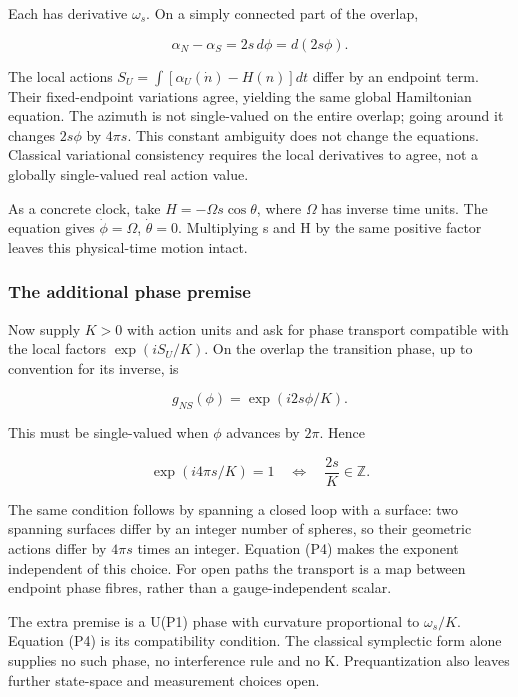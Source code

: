 \documentclass[11pt,a4paper]{article}
\begin{document}
Each has derivative \(\omega_s\). On a simply connected part of the
overlap,

\[\alpha_N-\alpha_S=2s\,d\phi=d(2s\phi). \tag{P3}\]

The local actions \(S_U=\int[\alpha_U(\dot n)-H(n)]dt\) differ by an
endpoint term. Their fixed-endpoint variations agree, yielding the same
global Hamiltonian equation. The azimuth is not single-valued on the
entire overlap; going around it changes \(2s\phi\) by \(4\pi s\). This
constant ambiguity does not change the equations. Classical variational
consistency requires the local derivatives to agree, not a globally
single-valued real action value.

As a concrete clock, take \(H=-\Omega s\cos\theta\), where \(\Omega\)
has inverse time units. The equation gives \(\dot\phi=\Omega\),
\(\dot\theta=0\). Multiplying s and H by the same positive factor leaves
this physical-time motion intact.

\hypertarget{the-additional-phase-premise}{%
\subsubsection{The additional phase
premise}\label{the-additional-phase-premise}}

Now supply \(K>0\) with action units and ask for phase transport
compatible with the local factors \(\exp(iS_U/K)\). On the overlap the
transition phase, up to convention for its inverse, is

\[g_{NS}(\phi)=\exp(i2s\phi/K).\]

This must be single-valued when \(\phi\) advances by \(2\pi\). Hence

\[\exp(i4\pi s/K)=1
\quad\Longleftrightarrow\quad \frac{2s}{K}\in\mathbb Z. \tag{P4}\]

The same condition follows by spanning a closed loop with a surface: two
spanning surfaces differ by an integer number of spheres, so their
geometric actions differ by \(4\pi s\) times an integer. Equation (P4)
makes the exponent independent of this choice. For open paths the
transport is a map between endpoint phase fibres, rather than a
gauge-independent scalar.

The extra premise is a U(P1) phase with curvature proportional to
\(\omega_s/K\). Equation (P4) is its compatibility condition. The
classical symplectic form alone supplies no such phase, no interference
rule and no K. Prequantization also leaves further state-space and
measurement choices open.
\end{document}
